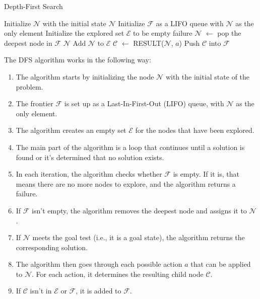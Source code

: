 \documentclass[a4paper,UKenglish,cleveref, autoref, thm-restate]{qlinhta}
\begin{document}
\begin{algorithm}[H]
\caption{Depth-First Search}\label{alg:dfs}
\begin{algorithmic}[1]
    \State Initialize $\mathcal{N}$ with the initial state
        \State \Return $\mathcal{N}$
    \EndIf
    \State Initialize $\mathcal{F}$ as a LIFO queue with $\mathcal{N}$ as the only element
    \State Initialize the explored set $\mathcal{E}$ to be empty
            \State \Return failure
        \EndIf
        \State $\mathcal{N}$ $\gets$ pop the deepest node in $\mathcal{F}$
            \State \Return $\mathcal{N}$
        \EndIf
        \State Add $\mathcal{N}$ to $\mathcal{E}$
            \State $\mathcal{C}$ $\gets$ RESULT($\mathcal{N}$, $a$)
                \State Push $\mathcal{C}$ into $\mathcal{F}$
            \EndIf
        \EndFor
    \EndWhile
\EndFunction
\end{algorithmic}
\end{algorithm}

The DFS algorithm works in the following way:
\begin{enumerate}
    \item The algorithm starts by initializing the node $\mathcal{N}$ with the initial state of the problem.
    \item The frontier $\mathcal{F}$ is set up as a Last-In-First-Out (LIFO) queue, with $\mathcal{N}$ as the only element.
    \item The algorithm creates an empty set $\mathcal{E}$ for the nodes that have been explored.
    \item The main part of the algorithm is a loop that continues until a solution is found or it's determined that no solution exists.
    \item In each iteration, the algorithm checks whether $\mathcal{F}$ is empty. If it is, that means there are no more nodes to explore, and the algorithm returns a failure.
    \item If $\mathcal{F}$ isn't empty, the algorithm removes the deepest node and assigns it to $\mathcal{N}$.
    \item If $\mathcal{N}$ meets the goal test (i.e., it is a goal state), the algorithm returns the corresponding solution.
    \item The algorithm then goes through each possible action $a$ that can be applied to $\mathcal{N}$. For each action, it determines the resulting child node $\mathcal{C}$.
    \item If $\mathcal{C}$ isn't in $\mathcal{E}$ or $\mathcal{F}$, it is added to $\mathcal{F}$.
\end{enumerate}
\end{document}
